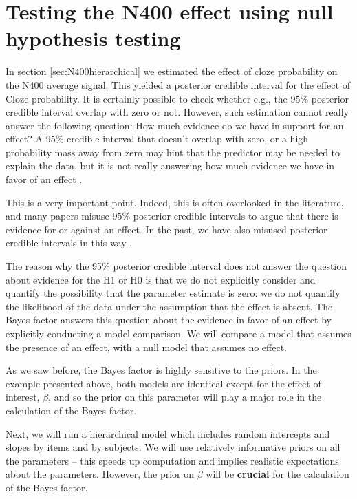 \documentclass[12pt,]{krantz}
\theoremstyle{definition}
\theoremstyle{definition}
\theoremstyle{definition}
\theoremstyle{remark}
\begin{document}
\hypertarget{sec:N400BF}{%
\section{Testing the N400 effect using null hypothesis testing}\label{sec:N400BF}}

In section \ref{sec:N400hierarchical} we estimated the effect of cloze probability on the N400 average signal. This yielded a posterior credible interval for the effect of Cloze probability. It is certainly possible to check whether e.g., the 95\% posterior credible interval overlap with zero or not. However, such estimation cannot really answer the following question: How much evidence do we have in support for an effect? A 95\% credible interval that doesn't overlap with zero, or a high probability mass away from zero may hint that the predictor may be needed to explain the data, but it is not really answering how much evidence we have in favor of an effect \citep[for discussion, see][]{Royall, wagenmakersPrinciplePredictiveIrrelevance2019, rouder2018bayesian}.

This is a very important point. Indeed, this is often overlooked in the literature, and many papers misuse 95\% posterior credible intervals to argue that there is evidence for or against an effect. In the past, we have also misused posterior credible intervals in this way \citep[and even recommended this incorrect interpretation in, for example,][]{NicenboimVasishth2016}.

The reason why the 95\% posterior credible interval does not answer the question about evidence for the H1 or H0 is that we do not explicitly consider and quantify the possibility that the parameter estimate is zero: we do not quantify the likelihood of the data under the assumption that the effect is absent.
The Bayes factor answers this question about the evidence in favor of an effect by explicitly conducting a model comparison. We will compare a model that assumes the presence of an effect, with a null model that assumes no effect.

As we saw before, the Bayes factor is highly sensitive to the priors. In the example presented above, both models are identical except for the effect of interest, \(\beta\), and so the prior on this parameter will play a major role in the calculation of the Bayes factor.

Next, we will run a hierarchical model which includes random intercepts and slopes by items and by subjects. We will use relatively informative priors on all the parameters -- this speeds up computation and implies realistic expectations about the parameters. However, the prior on \(\beta\) will be \textbf{crucial} for the calculation of the Bayes factor.
\end{document}
